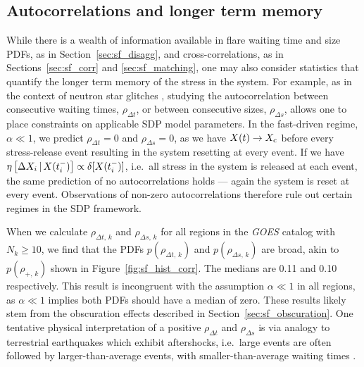 \subsection{Autocorrelations and longer term memory} \label{sec:sf_ac}
While there is a wealth of information available in flare waiting time and size PDFs, as in Section~\ref{sec:sf_disagg}, and cross-correlations, as in Sections~\ref{sec:sf_corr} and \ref{sec:sf_matching}, one may also consider statistics that quantify the longer term memory of the stress in the system. For example, as in the context of neutron star glitches \citep{Carlin2019ac}, studying the autocorrelation between consecutive waiting times, $\rho_{\Delta t}$, or between consecutive sizes, $\rho_{\Delta s}$,  allows one to place constraints on applicable SDP model parameters. In the fast-driven regime, $\alpha \ll 1$, we predict $\rho_{\Delta t} = 0$ and $\rho_{\Delta s} = 0$, as we have $X(t) \rightarrow X_\textrm{c}$ before every stress-release event resulting in the system resetting at every event. If we have $\eta\left[\Delta X_{i}\,|\,X(t_i^-)\right] \propto \delta[X(t_i^-)]$, i.e.~all stress in the system is released at each event, the same prediction of no autocorrelations holds --- again the system is reset at every event. Observations of non-zero autocorrelations therefore rule out certain regimes in the SDP framework.

When we calculate $\rho_{\Delta t,\,k}$ and $\rho_{\Delta s,\,k}$ for all regions in the \emph{GOES} catalog with $N_k \geq 10$, we find that the PDFs $p(\rho_{\Delta t,\,k})$ and $p(\rho_{\Delta s,\,k})$ are broad, akin to $p(\rho_{+,\,k})$ shown in Figure~\ref{fig:sf_hist_corr}. The medians are 0.11 and 0.10 respectively. This result is incongruent with the assumption $\alpha \ll 1$ in all regions, as $\alpha \ll 1$ implies both PDFs should have a median of zero. These results likely stem from the obscuration effects described in Section~\ref{sec:sf_obscuration}. One tentative physical interpretation of a positive $\rho_{\Delta t}$ and $\rho_{\Delta s}$ is via analogy to terrestrial earthquakes which exhibit aftershocks, i.e.~large events are often followed by larger-than-average events, with smaller-than-average waiting times \citep{Utsu1995}. 

